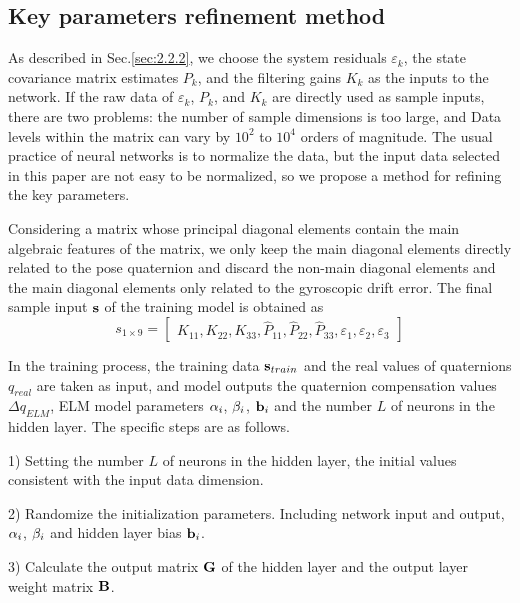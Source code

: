\documentclass{article}
\begin{document}
	\subsection{Key parameters refinement method}
	\label{sec:2.2.3}
	As described in Sec.\ref{sec:2.2.2}, we choose the system residuals ${\varepsilon _k}$, the state covariance matrix estimates $ {P_k} $, and the filtering gains $ {K_k} $ as the inputs to the network. If the raw data of ${\varepsilon _k}$, $ {P_k} $, and $ {K_k} $ are directly used as sample inputs, there are two problems: the number of sample dimensions is too large, and Data levels within the matrix can vary by ${10^2}$ to ${10^4}$ orders of magnitude. The usual practice of neural networks is to normalize the data, but the input data selected in this paper are not easy to be normalized, so we propose a method for refining the key parameters.
	
	Considering a matrix whose principal diagonal elements contain the main algebraic features of the matrix, we only keep the main diagonal elements directly related to the pose quaternion and discard the non-main diagonal elements and the main diagonal elements only related to the gyroscopic drift error. The final sample input $ {\bf{s}} $ of the training model is obtained as
	\begin{equation}
	{s_{1 \times 9}} = \left[ {\begin{array}{*{20}{c}}
		{{K_{11}}},{{K_{22}}},{{K_{33}}},{{{\hat P}_{11}}},{{{\hat P}_{22}}},{{{\hat P}_{33}}},{{\varepsilon _1}},{{\varepsilon _2}},{{\varepsilon _3}}
		\end{array}} \right]
	\end{equation}
	
	In the training process, the training data $ {{\bf{s}}_{train}} $ and the real values of quaternions ${q_{real}}$ are taken as input, and model outputs the quaternion compensation values $\Delta {q_{ELM}}$, ELM model parameters $ {{\bf{\alpha }}_i} $, $ {{\bf{\beta }}_i} $, $ {{\bf{b}}_i} $ and the number $ L $ of neurons in the hidden layer. The specific steps are as follows.
	
	1) Setting the number $ L $ of neurons in the hidden layer, the initial values consistent with the input data dimension.
	
	2) Randomize the initialization parameters. Including network input and output, $ {{\bf{\alpha }}_i} $, $ {{\bf{\beta }}_i} $ and hidden layer bias $ {{\bf{b}}_i} $.
	
	3) Calculate the output matrix $ {\bf{G}} $ of the hidden layer and  the output layer weight matrix $ {\bf{B}} $.
	
\end{document}
